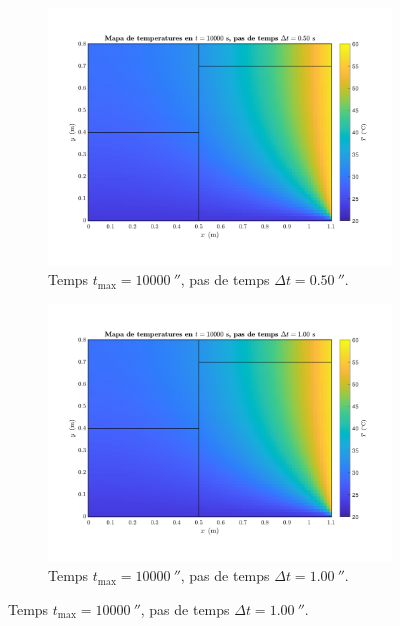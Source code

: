 \begin{figure}[ht]
	\centering
	\begin{subfigure}{.5\textwidth}
		\centering
		\includegraphics[width=.95\linewidth]{imagenes/04_influencia/pas_temps/pas_temps_13.pdf}
		\vspace{-15pt}
		\caption{Temps $t_\text{max} = 10000 \ \second$, pas de temps $\Delta t = 0.50 \ \second$.}
		\label{fig:pas_temps_13}
	\end{subfigure}%
	\begin{subfigure}{.5\textwidth}
		\centering
		\includegraphics[width=.95\linewidth]{imagenes/04_influencia/pas_temps/pas_temps_14.pdf}
		\vspace{-15pt}
		\caption{Temps $t_\text{max} = 10000 \ \second$, pas de temps $\Delta t = 1.00 \ \second$.}
		\label{fig:pas_temps_14}

\end{subfigure}
\end{figure}
